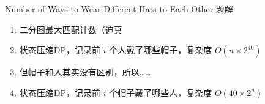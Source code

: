 \documentclass{beamer}
\begin{document}
\begin{frame}{\href{https://leetcode-cn.com/problems/number-of-ways-to-wear-different-hats-to-each-other/}{Number of Ways to Wear Different Hats to Each Other}}
{题解}

\begin{enumerate}
    \item 二分图最大匹配计数（迫真
    \item 状态压缩DP，记录前 $i$ 个人戴了哪些帽子，复杂度 $O(n\times 2^{40})$
    \item 但帽子和人其实没有区别，所以……
    \item 状态压缩DP，记录前 $i$ 个帽子戴了哪些人，复杂度 $O(40\times 2^n)$
\end{enumerate}
\end{frame}
\end{document}
